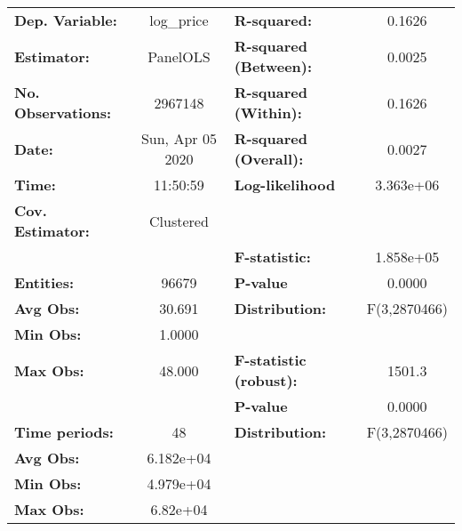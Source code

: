 \documentclass{report}
\begin{document}
\begin{center}
\begin{tabular}{lclc}
\toprule
\textbf{Dep. Variable:}      &     log\_price     & \textbf{  R-squared:         }   &      0.1626      \\
\textbf{Estimator:}          &      PanelOLS      & \textbf{  R-squared (Between):}  &      0.0025      \\
\textbf{No. Observations:}   &      2967148       & \textbf{  R-squared (Within):}   &      0.1626      \\
\textbf{Date:}               &  Sun, Apr 05 2020  & \textbf{  R-squared (Overall):}  &      0.0027      \\
\textbf{Time:}               &      11:50:59      & \textbf{  Log-likelihood     }   &    3.363e+06     \\
\textbf{Cov. Estimator:}     &     Clustered      & \textbf{                     }   &                  \\
\textbf{}                    &                    & \textbf{  F-statistic:       }   &    1.858e+05     \\
\textbf{Entities:}           &       96679        & \textbf{  P-value            }   &      0.0000      \\
\textbf{Avg Obs:}            &       30.691       & \textbf{  Distribution:      }   &   F(3,2870466)   \\
\textbf{Min Obs:}            &       1.0000       & \textbf{                     }   &                  \\
\textbf{Max Obs:}            &       48.000       & \textbf{  F-statistic (robust):} &      1501.3      \\
\textbf{}                    &                    & \textbf{  P-value            }   &      0.0000      \\
\textbf{Time periods:}       &         48         & \textbf{  Distribution:      }   &   F(3,2870466)   \\
\textbf{Avg Obs:}            &     6.182e+04      & \textbf{                     }   &                  \\
\textbf{Min Obs:}            &     4.979e+04      & \textbf{                     }   &                  \\
\textbf{Max Obs:}            &      6.82e+04      & \textbf{                     }   &                  \\
\bottomrule
\end{tabular}
\begin{tabular}{lcccccc}

\end{tabular}
\end{center}
\end{document}
